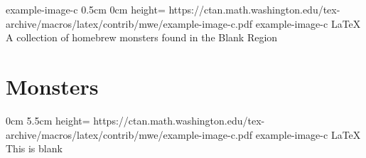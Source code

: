 \documentclass[letterpaper,openany,twoside,twocolumn]{book}
\begin{document}
		{example-image-c}%
		{0.5cm}%
		{0cm}%
		{height=\paperheight}%
		{https://ctan.math.washington.edu/tex-archive/macros/latex/contrib/mwe/example-image-c.pdf}%
		{example-image-c}%
		{LaTeX}%
		{A collection of homebrew monsters found in the Blank Region}%
	
	\tableofcontents
	
	\mainmatter
	
	\MonsterSheetGeometry
	\part{Monsters}
	
	
		{0cm}%
		{5.5cm}%
		{height=\paperheight}%
		{https://ctan.math.washington.edu/tex-archive/macros/latex/contrib/mwe/example-image-c.pdf}%
		{example-image-c}%
		{LaTeX}%
		{This is blank}%
\end{document}

